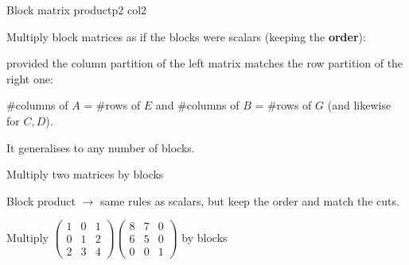 \documentclass[course,noautoquant,noautokw]{neyvia-study}
\begin{document}
\begin{concept}[1.51]{Block matrix product}{p2 col2}
\begin{definition}
\noindent Multiply block matrices as if the blocks were scalars (keeping the \textbf{order}):
\par\noindent provided the column partition of the left matrix matches the row partition of the right one:
\par\noindent \#columns of $A$ = \#rows of $E$ and \#columns of $B$ = \#rows of $G$ (and likewise for $C,D$).
\par\noindent It generalises to any number of blocks.
\end{definition}
\begin{method}{Multiply two matrices by blocks}
\end{method}
\begin{reflex}
Block product \ensuremath{\rightarrow} same rules as scalars, but keep the order and match the cuts.
\end{reflex}
\begin{worked}{Multiply $\begin{pmatrix}1&0&1\\0&1&2\\2&3&4\end{pmatrix}\begin{pmatrix}8&7&0\\6&5&0\\0&0&1\end{pmatrix}$ by blocks}

\end{worked}
\end{concept}
\end{document}
